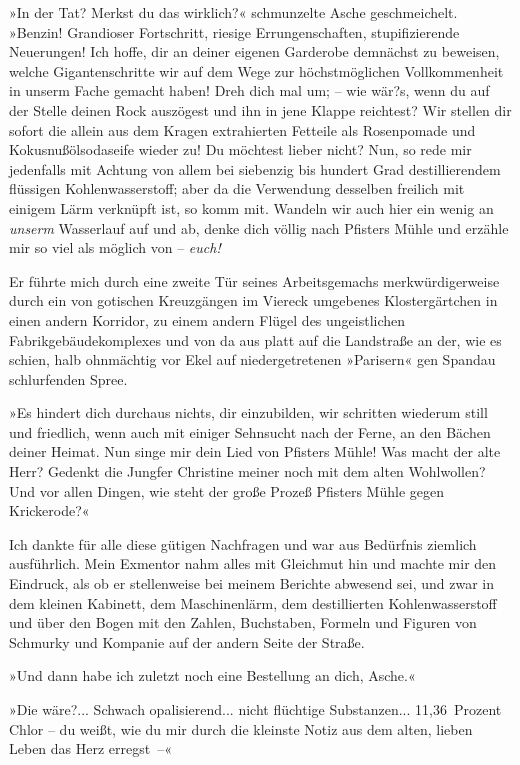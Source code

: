 »In der Tat? Merkst du das wirklich?« schmunzelte Asche
geschmeichelt. »Benzin! Grandioser Fortschritt, riesige
Errungenschaften, stupifizierende Neuerungen! Ich hoffe, dir an
deiner eigenen Garderobe demnächst zu beweisen, welche
Gigantenschritte wir auf dem Wege zur höchstmöglichen
Vollkommenheit in unserm Fache gemacht haben! Dreh dich mal um; –
wie wär?s, wenn du auf der Stelle deinen Rock auszögest und ihn in
jene Klappe reichtest? Wir stellen dir sofort die allein aus dem
Kragen extrahierten Fetteile als Rosenpomade und
Kokusnußölsodaseife wieder zu! Du möchtest lieber nicht? Nun, so
rede mir jedenfalls mit Achtung von allem bei siebenzig bis hundert
Grad destillierendem flüssigen Kohlenwasserstoff; aber da die
Verwendung desselben freilich mit einigem Lärm verknüpft ist, so
komm mit. Wandeln wir auch hier ein wenig an \emph{unserm}
Wasserlauf auf und ab, denke dich völlig nach Pfisters Mühle und
erzähle mir so viel als möglich von – \emph{euch!}

Er führte mich durch eine zweite Tür seines Arbeitsgemachs
merkwürdigerweise durch ein von gotischen Kreuzgängen im Viereck
umgebenes Klostergärtchen in einen andern Korridor, zu einem andern
Flügel des ungeistlichen Fabrikgebäudekomplexes und von da aus
platt auf die Landstraße an der, wie es schien, halb ohnmächtig vor
Ekel auf niedergetretenen »Parisern« gen Spandau schlurfenden
Spree.

»Es hindert dich durchaus nichts, dir einzubilden, wir schritten
wiederum still und friedlich, wenn auch mit einiger Sehnsucht nach
der Ferne, an den Bächen deiner Heimat. Nun singe mir dein Lied von
Pfisters Mühle! Was macht der alte Herr? Gedenkt die Jungfer
Christine meiner noch mit dem alten Wohlwollen? Und vor allen
Dingen, wie steht der große Prozeß Pfisters Mühle gegen
Krickerode?«

Ich dankte für alle diese gütigen Nachfragen und war aus Bedürfnis
ziemlich ausführlich. Mein Exmentor nahm alles mit Gleichmut hin
und machte mir den Eindruck, als ob er stellenweise bei meinem
Berichte abwesend sei, und zwar in dem kleinen Kabinett, dem
Maschinenlärm, dem destillierten Kohlenwasserstoff und über den
Bogen mit den Zahlen, Buchstaben, Formeln und Figuren von Schmurky
und Kompanie auf der andern Seite der Straße.

»Und dann habe ich zuletzt noch eine Bestellung an dich, Asche.«

»Die wäre?... Schwach opalisierend... nicht flüchtige Substanzen...
11,36~Prozent Chlor – du weißt, wie du mir durch die kleinste Notiz
aus dem alten, lieben Leben das Herz erregst~–«


